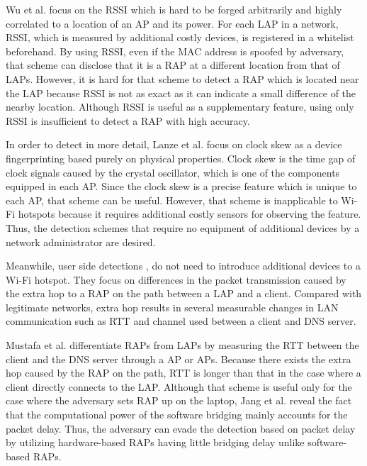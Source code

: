 \documentclass[conference]{IEEEtran}
\begin{document}
Wu et al. \cite{prapd} focus on the RSSI which is hard to be forged arbitrarily and highly correlated to a location of an AP and its power.
For each LAP in a network, RSSI, which is measured by additional costly devices, is registered in a whitelist beforehand.
By using RSSI, even if the MAC address is spoofed by adversary, that scheme can disclose that it is a RAP at a different location from that of LAPs.
However, it is hard for that scheme to detect a RAP which is located near the LAP because RSSI is not as exact as it can indicate a small difference of the nearby location.
Although RSSI is useful as a supplementary feature, using only RSSI is insufficient to detect a RAP with high accuracy.

In order to detect in more detail, Lanze et al. \cite{clockskew} focus on clock skew as a device fingerprinting based purely on physical properties.
Clock skew is the time gap of clock signals caused by the crystal oscillator, which is one of the components equipped in each AP.
Since the clock skew is a precise feature which is unique to each AP, that scheme can be useful.
However, that scheme is inapplicable to Wi-Fi hotspots because it requires additional costly sensors for observing the feature.
Thus, the detection schemes that require no equipment of additional devices by a network administrator are desired.

Meanwhile, user side detections \cite{rtt}, \cite{previous} do not need to introduce additional devices to a Wi-Fi hotspot.
They focus on differences in the packet transmission caused by the extra hop to a RAP on the path between a LAP and a client.
Compared with legitimate networks, extra hop results in several measurable changes in LAN communication such as RTT and channel used between a client and DNS server.

Mustafa et al. \cite{rtt} differentiate RAPs from LAPs by measuring the RTT between the client and the DNS server through a AP or APs.
Because there exists the extra hop caused by the RAP on the path, RTT is longer than that in the case where a client directly connects to the LAP.
Although that scheme is useful only for the case where the adversary sets RAP up on the laptop, Jang et al. \cite{previous} reveal the fact that the computational power of the software bridging mainly accounts for the packet delay.
Thus, the adversary can evade the detection based on packet delay by utilizing hardware-based RAPs having little bridging delay unlike software-based RAPs.
\end{document}
